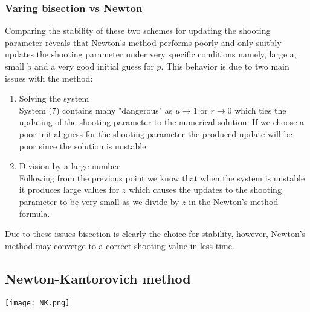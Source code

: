 \documentclass{article}
\begin{document}
\subsubsection{Varing bisection vs Newton}
Comparing the stability of these two schemes for updating the shooting parameter reveals that Newton's method performs poorly and only suitbly updates the shooting parameter under very specific conditions namely, large a, small b and a very good initial guess for $p$. This behavior is due to two main issues with the method:
\begin{enumerate}
\item Solving the system \\
System (7) contains many "dangerous" as $u\rightarrow 1$ or $r\rightarrow 0$ which ties the updating of the shooting parameter to the numerical solution. If we choose a poor initial guess for the shooting parameter the produced update will be poor since the solution is unstable. 
\item Division by a large number \\
Following from the previous point we know that when the system is unstable it produces large values for $z$ which causes the updates to the shooting parameter to be very small as we divide by $z$ in the Newton's method formula.
\end{enumerate} 
Due to these issues bisection is clearly the choice for stability, however, Newton's method may converge to a correct shooting value in less time. 

\subsection{Newton-Kantorovich method}
\texttt{[image: NK.png]}
\end{document}

